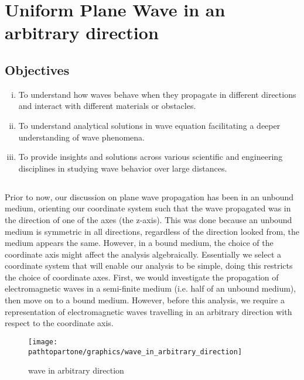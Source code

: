 \chapter{Uniform Plane Wave in an arbitrary direction}\label{lec:lec29}

\begin{mdframed}[backgroundcolor=lightblue, linewidth=1pt,  hidealllines=true]
\section{Objectives}
\begin{enumerate}[(i)]
\item To understand how waves behave when they propagate in different directions and interact with different materials or obstacles.
\item To understand analytical solutions in wave equation facilitating a deeper understanding of wave phenomena.
\item To provide insights and solutions across various scientific and engineering disciplines in studying wave behavior over large distances.
\end{enumerate}
\end{mdframed}
\section{}
Prior to now, our discussion on plane wave propagation has been in an unbound medium, orienting our coordinate system such that the wave propagated was in the direction of one of the axes (the z-axis). This was done because an unbound medium is symmetric in all directions, regardless of the direction looked from, the medium appears the same.
However, in a bound medium, the choice of the coordinate axis might affect the analysis algebraically.
Essentially we select a coordinate system that will enable our analysis to be simple, doing this restricts the choice of coordinate axes. First, we would investigate the propagation of electromagnetic waves in a semi-finite medium (i.e. half of an unbound medium), then move on to a bound medium. However, before this analysis, we require a representation of electromagnetic waves travelling in an arbitrary direction with respect to the coordinate axis.
\begin{figure}[h]
\centering
\texttt{[image: \\pathtopartone/graphics/wave\_in\_arbitrary\_direction]}
\caption{wave in arbitrary direction}
\label{fig:wave_in_arbitrary_direction}
\end{figure}

